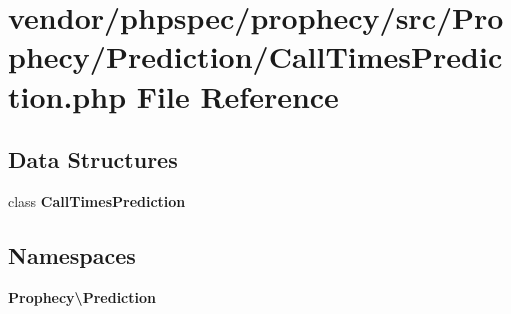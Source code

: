 \section{vendor/phpspec/prophecy/src/\+Prophecy/\+Prediction/\+Call\+Times\+Prediction.php File Reference}
\label{_call_times_prediction_8php}
\subsection*{Data Structures}
\begin{DoxyCompactItemize}
\item 
class {\bf Call\+Times\+Prediction}
\end{DoxyCompactItemize}
\subsection*{Namespaces}
\begin{DoxyCompactItemize}
\item 
 {\bf Prophecy\textbackslash{}\+Prediction}
\end{DoxyCompactItemize}
